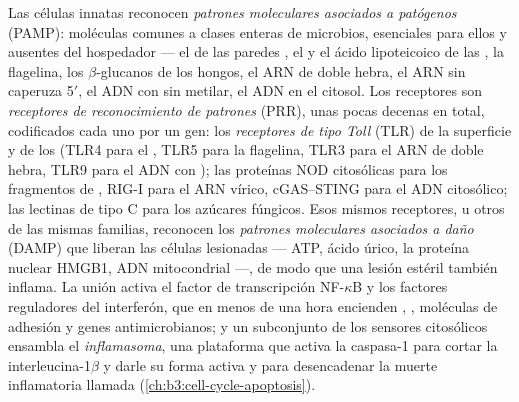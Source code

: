 \begin{definition}\label{def:b3:innate-immunity:prr}
Las células innatas reconocen \emph{patrones moleculares asociados a
patógenos} (PAMP): moléculas comunes a clases enteras de microbios,
esenciales para ellos y ausentes del hospedador --- el 
de las paredes , el  y el ácido lipoteicoico
de las , la flagelina, los $\beta$-glucanos de los hongos,
el ARN de doble hebra, el ARN sin caperuza 5$'$, el ADN con  sin
metilar, el ADN en el citosol. Los receptores son \emph{receptores de
reconocimiento de patrones} (PRR), unas pocas decenas en total,
codificados cada uno por un gen: los \emph{receptores de tipo Toll} (TLR)
de la superficie y de los  (TLR4 para el , TLR5
para la flagelina, TLR3 para el ARN de doble hebra, TLR9 para el ADN con
); las proteínas NOD citosólicas para los fragmentos de
, RIG-I para el ARN vírico, cGAS--STING para el ADN
citosólico; las lectinas de tipo C para los azúcares fúngicos. Esos
mismos receptores, u otros de las mismas familias, reconocen los
\emph{patrones moleculares asociados a daño} (DAMP) que liberan las
células lesionadas --- ATP, ácido úrico, la proteína nuclear HMGB1, ADN
mitocondrial ---, de modo que una lesión estéril también inflama. La
unión activa el factor de transcripción NF-$\kappa$B y los factores
reguladores del interferón, que en menos de una hora encienden ,
, moléculas de adhesión y genes antimicrobianos; y un
subconjunto de los sensores citosólicos ensambla el
\emph{inflamasoma}, una plataforma que activa la caspasa-1 para cortar la
interleucina-1$\beta$ y darle su forma activa y para desencadenar la
muerte inflamatoria llamada 
(\cref{ch:b3:cell-cycle-apoptosis}).
\end{definition}

